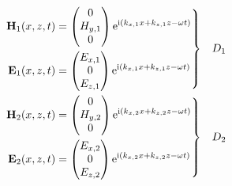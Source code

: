 \begin{align}
\left.\begin{aligned}
\mathbf{H}_1(x,z,t) &=
\begin{pmatrix}
0\\
H_{y,1}\\
0
\end{pmatrix} {\mathrm{e}}^{{\mathrm{i}}(k_{x,1}x+k_{z,1}z-\omega t)}\\
\mathbf{E}_1(x,z,t) &=
\begin{pmatrix}
E_{x,1}\\
0\\
E_{z,1}\\
\end{pmatrix} {\mathrm{e}}^{{\mathrm{i}}(k_{x,1}x+k_{z,1}z-\omega t)}
\end{aligned}
\right\}& \quad D_1\label{eqn:planewavedielectric}\\
\left.\begin{aligned}
\mathbf{H}_2(x,z,t) &=
\begin{pmatrix}
0\\
H_{y,2}\\
0
\end{pmatrix}
{\mathrm{e}}^{{\mathrm{i}}(k_{x,2}x+k_{z,2}z-\omega t)}\\
\mathbf{E}_2(x,z,t) &=
\begin{pmatrix}
E_{x,2}\\
0\\
E_{z,2}\\
\end{pmatrix}
{\mathrm{e}}^{{\mathrm{i}}(k_{x,2}x+k_{z,2}z-\omega t)}
\end{aligned} 
\right\}&\quad D_2
\label{eqn:planewavemetal}
\end{align}

